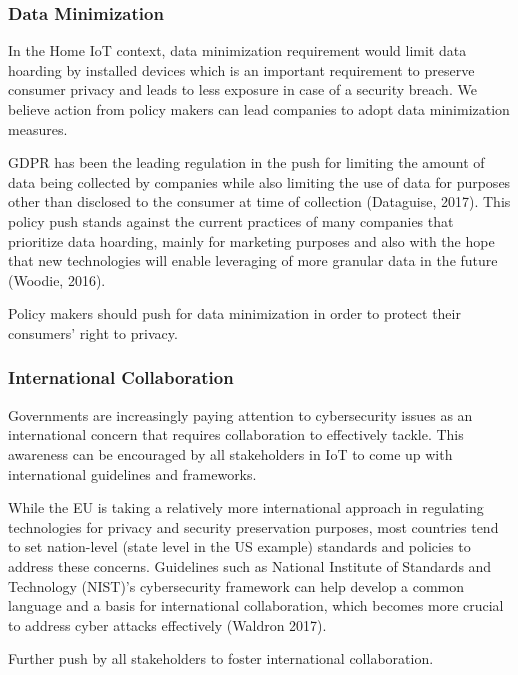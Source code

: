 \subsubsection{Data Minimization}
In the Home IoT context, data minimization requirement would limit data hoarding by installed devices which is an important requirement to preserve consumer privacy and leads to less exposure in case of a security breach. We believe action from policy makers can lead companies to adopt data minimization measures. 

 GDPR has been the leading regulation in the push for limiting the amount of data being collected by companies while also limiting the use of data for purposes other than disclosed to the consumer at time of collection (Dataguise, 2017). This policy push stands against the current practices of many companies that prioritize data hoarding, mainly for marketing purposes and also with the hope that new technologies will enable leveraging of more granular data in the future (Woodie, 2016).

 Policy makers should push for data minimization in order to protect their consumers’ right to privacy. 

\subsubsection{International Collaboration}
Governments are increasingly paying attention to cybersecurity issues as an international concern that requires collaboration to effectively tackle. This awareness can be encouraged by all stakeholders in IoT to come up with international guidelines and frameworks.

 While the EU is taking a relatively more international approach in regulating technologies for privacy and security preservation purposes, most countries tend to set nation-level (state level in the US example) standards and policies to address these concerns. Guidelines such as National Institute of Standards and Technology (NIST)’s cybersecurity framework can help develop a common language and a basis for international collaboration, which becomes more crucial to address cyber attacks effectively (Waldron 2017).

 Further push by all stakeholders to foster international collaboration.
